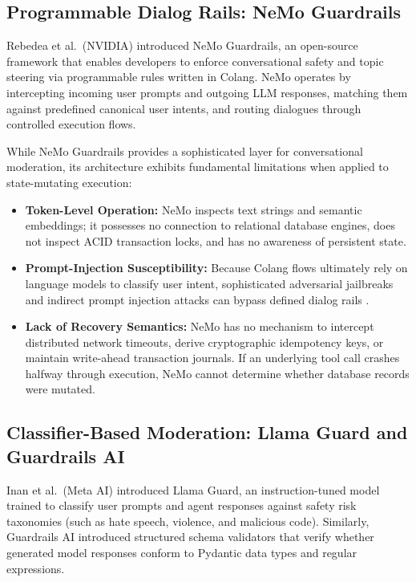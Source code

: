 \subsection{Programmable Dialog Rails: NeMo Guardrails}

Rebedea et al.\ (NVIDIA) \cite{rebedea2023nemo} introduced NeMo Guardrails, an open-source framework that enables developers to enforce conversational safety and topic steering via programmable rules written in Colang. NeMo operates by intercepting incoming user prompts and outgoing LLM responses, matching them against predefined canonical user intents, and routing dialogues through controlled execution flows.

While NeMo Guardrails provides a sophisticated layer for conversational moderation, its architecture exhibits fundamental limitations when applied to state-mutating execution:
\begin{itemize}
    \item \textbf{Token-Level Operation:} NeMo inspects text strings and semantic embeddings; it possesses no connection to relational database engines, does not inspect ACID transaction locks, and has no awareness of persistent state.
    \item \textbf{Prompt-Injection Susceptibility:} Because Colang flows ultimately rely on language models to classify user intent, sophisticated adversarial jailbreaks and indirect prompt injection attacks can bypass defined dialog rails \cite{perez2022ignore}.
    \item \textbf{Lack of Recovery Semantics:} NeMo has no mechanism to intercept distributed network timeouts, derive cryptographic idempotency keys, or maintain write-ahead transaction journals. If an underlying tool call crashes halfway through execution, NeMo cannot determine whether database records were mutated.
\end{itemize}

\subsection{Classifier-Based Moderation: Llama Guard and Guardrails AI}

Inan et al.\ (Meta AI) \cite{inan2023llama} introduced Llama Guard, an instruction-tuned model trained to classify user prompts and agent responses against safety risk taxonomies (such as hate speech, violence, and malicious code). Similarly, Guardrails AI introduced structured schema validators that verify whether generated model responses conform to Pydantic data types and regular expressions.

